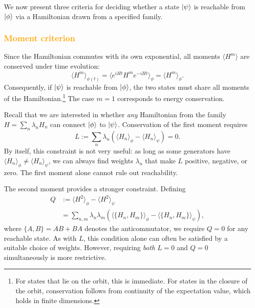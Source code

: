 \documentclass[aps,prx,reprint,superscriptaddress,footnote, twocolumn,notitlepage]{revtex4-2}
\newcommand{\ko}[1]{\textcolor{orange}{#1}}
\newcommand{\todoko}[1]{\ko{$\diamondsuit$ #1}}
\begin{document}
We now present three criteria for deciding whether a state $\ket{\psi}$
 is reachable from $\ket{\phi}$ via a Hamiltonian drawn from a specified family.
\subsubsection{\ko{Moment criterion}}

Since the Hamiltonian commutes with its own exponential, all moments $\langle H^m \rangle$ are conserved under time evolution:
\begin{equation}
    \langle H^m \rangle_{\phi(t)} = \langle e^{iHt} H^m e^{-iHt} \rangle_\phi = \langle H^m \rangle_\phi.
\end{equation}
Consequently, if $\ket{\psi}$ is reachable from $\ket{\phi}$, the two states must share all moments of the Hamiltonian.\footnote{For states that lie on the orbit, this is immediate. For states in the closure of the orbit, conservation follows from continuity of the expectation value, which holds in finite dimensions.} The case $m=1$ corresponds to energy conservation.

Recall that we are interested in whether \emph{any} Hamiltonian from the family $H = \sum_n \lambda_n H_n$ can connect $\ket{\phi}$ to $\ket{\psi}$. Conservation of the first moment requires
\begin{equation}
    L := \sum_n \lambda_n \left( \langle H_n \rangle_\phi - \langle H_n \rangle_\psi \right) = 0.
\end{equation}
By itself, this constraint is not very useful: as long as some generators have $\langle H_n \rangle_\phi \neq \langle H_n \rangle_\psi$, we can always find weights $\lambda_n$ that make $L$ positive, negative, or zero. The first moment alone cannot rule out reachability.

The second moment provides a stronger constraint. Defining
\begin{equation}\begin{aligned}
    Q &:= \langle H^2 \rangle_\phi - \langle H^2 \rangle_\psi \\
    &= \sum_{n,m} \lambda_n \lambda_m \left( \langle \{H_n, H_m\} \rangle_\phi - \langle \{H_n, H_m\} \rangle_\psi \right),
    \end{aligned}
\end{equation}
where $\{A, B\} = AB + BA$ denotes the anticommutator, we require $Q = 0$ for any reachable state. As with $L$, this condition alone can often be satisfied by a suitable choice of weights. However, requiring \emph{both} $L = 0$ and $Q = 0$ simultaneously is more restrictive.
\end{document}
